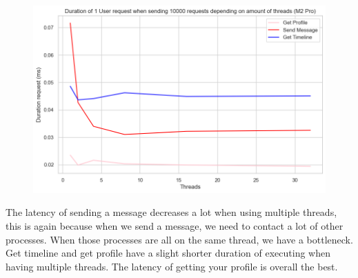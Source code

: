 \documentclass[a4paper]{article}
\begin{document}
\begin{figure}[H]
	\centering
	\includegraphics[width = \linewidth]{Images/Latency.png}
	\caption{}
\end{figure}
The latency of sending a message decreases a lot when using multiple threads, this is again because when we send a message, we need to contact a lot of other processes.
When those processes are all on the same thread, we have a bottleneck. Get timeline and get profile have a slight shorter duration of executing when having multiple threads. The latency of getting your profile is overall the best.   
\end{document}

